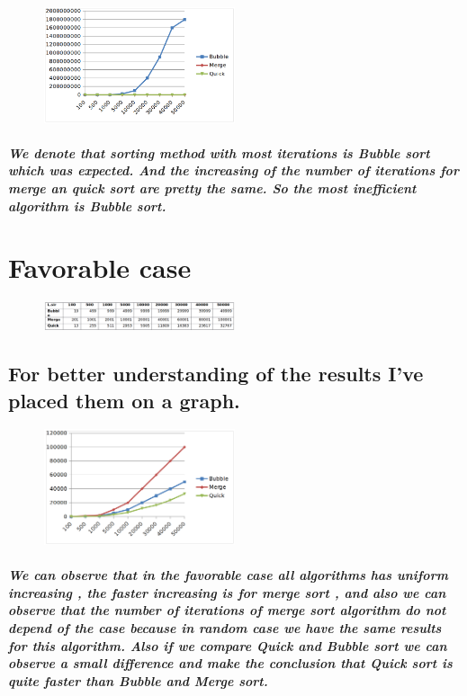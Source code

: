 \documentclass[12pt]{article}
\begin{document}
\begin{figure}[h!]
  \centering
    {%
      \includegraphics[width=0.5\textwidth]{8}}
\end{figure}

\subparagraph*{
We denote that sorting method with most iterations is Bubble sort which was expected. And the increasing of the number of iterations for merge an quick sort are pretty the same. So the most inefficient algorithm is Bubble sort.
}




\newpage
\section{Favorable case}

\begin{figure}[h!]
  \centering
    {%
      \includegraphics[width=0.5\textwidth]{5}}
\end{figure}

\subsection*{
For better understanding of the results I've placed them on a graph.
}

\begin{figure}[h!]
  \centering
    {%
      \includegraphics[width=0.5\textwidth]{6}}
\end{figure}

\subparagraph*{
	We can observe that in the favorable case all algorithms has uniform increasing , the faster increasing is for merge sort , and also we can observe that the number of iterations of merge sort algorithm do not depend of the case because in random case we have the same results for this algorithm. Also if we compare Quick and Bubble sort we can observe a small difference and make the conclusion that Quick sort is quite faster than Bubble and Merge sort.
}
\end{document}
